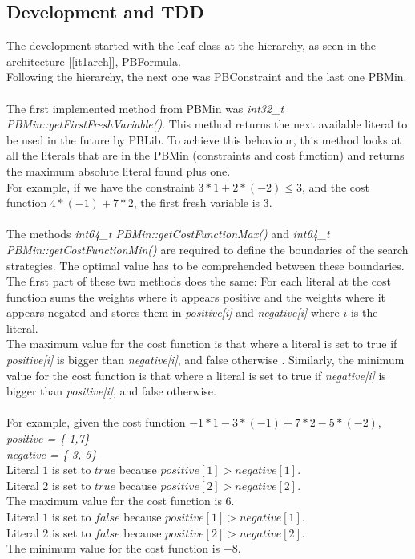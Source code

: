 \subsection{Development and TDD}

The development started with the leaf class at the hierarchy, as seen in the architecture [\ref{it1arch}], PBFormula.  \\
Following the hierarchy, the next one was PBConstraint and the last one PBMin. \\\\
The first implemented method from PBMin was \emph{int32\_t PBMin::getFirstFreshVariable()}. This method returns the next available literal to be used in the future by PBLib. To achieve this behaviour, this method looks at all the literals that are in the PBMin (constraints and cost function) and returns the maximum absolute literal found plus one.  \\
For example, if we have the constraint $3*1 + 2*(-2) \leq 3$, and the cost function $4*(-1) + 7*2$, the first fresh variable is 3. \\\\
The methods \emph{int64\_t PBMin::getCostFunctionMax()} and \emph{int64\_t PBMin::getCostFunctionMin()} are required to define the boundaries of the search strategies. The optimal value has to be comprehended between these boundaries.  \\
The first part of these two methods does the same: For each literal at the cost function sums the weights where it appears positive and the weights where it appears negated and stores them in \emph{positive[i]} and \emph{negative[i]} where $i$ is the literal.\\
The maximum value for the cost function is that where a literal is set to true if \emph{positive[i]} is bigger than \emph{negative[i]}, and false otherwise	. Similarly, the minimum value for the cost function is that where a literal is set to true if \emph{negative[i]} is bigger than \emph{positive[i]}, and false otherwise.\\\\
For example, given the cost function $-1*1 - 3*(-1) + 7*2 -5*(-2)$,\\
\emph{positive = \{-1,7\}}\\
\emph{negative = \{-3,-5\}}\\
Literal $1$ is set to $true$ because $positive[1] > negative[1]$.\\
Literal $2$ is set to $true$ because $positive[2] > negative[2]$.\\
The maximum value for the cost function is $6$.\\
Literal $1$ is set to $false$ because $positive[1] > negative[1]$.\\
Literal $2$ is set to $false$ because $positive[2] > negative[2]$.\\
The minimum value for the cost function is $-8$.

